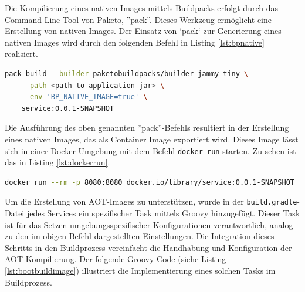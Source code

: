 Die Kompilierung eines nativen Images mittels Buildpacks erfolgt durch das Command-Line-Tool von Paketo, ''pack''. Dieses Werkzeug ermöglicht eine Erstellung von nativen Images. Der Einsatz von `pack` zur Generierung eines nativen Images wird durch den folgenden Befehl in Listing \ref{lst:bpnative} realisiert.

\begin{lstlisting}[language=bash, caption={Erstellung eines nativen Images mit dem Command-Line-Tool ''pack''.},label={lst:bpnative}]
pack build --builder paketobuildpacks/builder-jammy-tiny \
    --path <path-to-application-jar> \
    --env 'BP_NATIVE_IMAGE=true' \
    service:0.0.1-SNAPSHOT
\end{lstlisting}

Die Ausführung des oben genannten ''pack''-Befehls resultiert in der Erstellung eines nativen Images, das als Container Image exportiert wird. Dieses Image lässt sich in einer Docker-Umgebung mit dem Befehl \lstinline{docker run} starten. Zu sehen ist das in Listing \ref{lst:dockerrun}.

\begin{lstlisting}[language=bash, caption={Starten des nativen Images als Docker-Container.}, label={lst:dockerrun}]
docker run --rm -p 8080:8080 docker.io/library/service:0.0.1-SNAPSHOT
\end{lstlisting}

Um die Erstellung von AOT-Images zu unterstützen, wurde in der \lstinline{build.gradle}-Datei jedes Services ein spezifischer Task mittels Groovy hinzugefügt. Dieser Task ist für das Setzen umgebungsspezifischer Konfigurationen verantwortlich, analog zu den im obigen Befehl dargestellten Einstellungen. Die Integration dieses Schritts in den Buildprozess vereinfacht die Handhabung und Konfiguration der AOT-Kompilierung. Der folgende Groovy-Code (siehe Listing \ref{lst:bootbuildimage}) illustriert die Implementierung eines solchen Tasks im Buildprozess.

